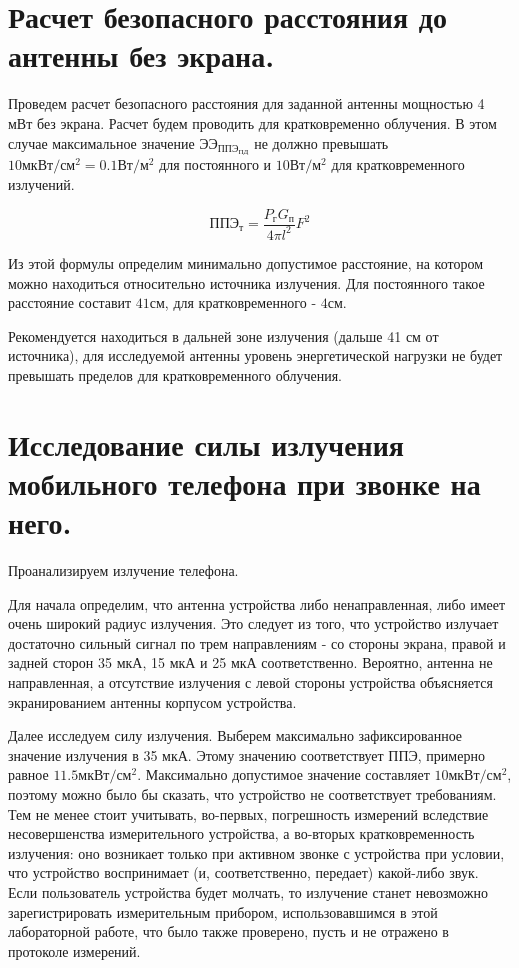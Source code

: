 \section*{Расчет безопасного расстояния до антенны без экрана.}
Проведем расчет безопасного расстояния для заданной антенны мощностью 4 мВт без экрана.
Расчет будем проводить для кратковременно облучения.
В этом случае максимальное значение $\text{ЭЭ}_{\text{ППЭ}_\text{ПД}}$ не должно
превышать $10 \text{мкВт} / \text{см}^2 = 0.1 \text{Вт} / \text{м}^2$ для постоянного и 
$10 \text{Вт} / \text{м}^2$ для кратковременного излучений.

\begin{displaymath}
    \text{ППЭ}_\text{т} = \frac{P_{\text{г}} G_{\text{п}}}{4\pi l^2} F^2
\end{displaymath}

Из этой формулы определим минимально допустимое расстояние, на котором можно находиться 
относительно источника излучения. Для постоянного такое расстояние составит $41 \text{см}$, 
для кратковременного - $4 \text{см}$.

Рекомендуется находиться в дальней зоне излучения (дальше 41 см от источника),
для исследуемой антенны уровень энергетической нагрузки не будет превышать
пределов для кратковременного облучения.


\section*{Исследование силы излучения мобильного телефона при звонке на него.}
Проанализируем излучение телефона.

Для начала определим, что антенна устройства либо ненаправленная, либо имеет очень широкий радиус излучения.
Это следует из того, что устройство излучает достаточно сильный сигнал по трем направлениям - со стороны 
экрана, правой и задней сторон 35 мкА, 15 мкА и 25 мкА соответственно. Вероятно, антенна не направленная, а
отсутствие излучения с левой стороны устройства объясняется экранированием антенны корпусом устройства.

Далее исследуем силу излучения. Выберем максимально зафиксированное значение излучения в 35 мкА. Этому 
значению соответствует ППЭ, примерно равное $11.5 \text{мкВт} / \text{см}^2$. Максимально 
допустимое значение составляет $10 \text{мкВт} / \text{см}^2$, поэтому можно было бы сказать, 
что устройство не соответствует требованиям. Тем не менее стоит учитывать, во-первых, погрешность измерений
вследствие несовершенства измерительного устройства, а во-вторых кратковременность излучения: оно возникает 
только при активном звонке с устройства при условии, что устройство воспринимает (и, соответственно, передает)
какой-либо звук. Если пользователь устройства будет молчать, то излучение станет невозможно зарегистрировать
измерительным прибором, использовавшимся в этой лабораторной работе, что было также проверено, пусть и не 
отражено в протоколе измерений.